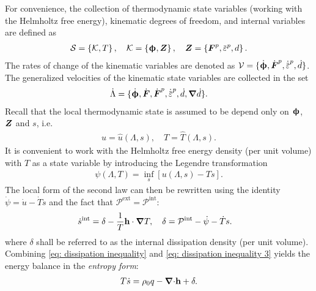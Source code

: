 For convenience, the collection of thermodynamic state variables (working with the Helmholtz free energy), kinematic degrees of freedom, and internal variables are defined as
\begin{align}
  \mathcal{S} = \left\{ \mathcal{K}, T \right\}, \quad \mathcal{K} = \left\{ \bs{\upphi}, \bfZ \right\}, \quad \bfZ = \left\{ \bfF^p, \ep, d \right\}.
\end{align}
The rates of change of the kinematic variables are denoted as $\mathcal{V} = \{ \defrate, \dot{\defgrad}^p, \epdot, \dot{d} \}$. The generalized velocities of the kinematic state variables are collected in the set
\begin{align}
  \dot{\Lambda} = \{ \defrate, \dot{\defgrad}, \dot{\defgrad}^p, \epdot, \dot{d}, \grad \dot{d} \}.
\end{align}
Recall that the local thermodynamic state is assumed to be depend only on $\boldsymbol{\upphi}$, $\boldsymbol{Z}$ and $s$, i.e.
\begin{align}
  u = \hat{u}(\Lambda, s), \quad T = \hat{T}(\Lambda, s).
\end{align}
It is convenient to work with the Helmholtz free energy density (per unit volume) with $T$ as a state variable by introducing the Legendre transformation
\begin{align}
  \psi(\Lambda, T) = \inf_s \left[ u(\Lambda, s) - Ts \right].
\end{align}
The local form of the second law can then be rewritten using the identity $\dot{\psi} = \dot{u} - \dot{T}s$ and the fact that $\mathcal{P}^\text{ext} = \mathcal{P}^\text{int}$:
\begin{align}
  \dot{s}^\text{int} & = \delta - \dfrac{1}{T} \textbf{h} \cdot \boldsymbol{\nabla} T,  \quad \delta = \mathcal{P}^\text{int} - \dot{\psi} - \dot{T}s. \label{eq: dissipation inequality 3} 
\end{align}
where $\delta$ shall be referred to as the internal dissipation density (per unit volume). Combining \eqref{eq: dissipation inequality} and \eqref{eq: dissipation inequality 3} yields the energy balance in the \emph{entropy form}:
\begin{align}
  T\dot{s} = \rho_0 q - {\boldsymbol{\nabla} \cdot} \textbf{h} + \delta. \label{eq: energy balance entropy form}
\end{align}

